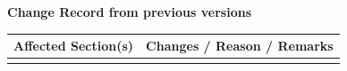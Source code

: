 \documentclass[12pt,a4paper]{article}
\begin{document}
\vspace{3cm}

\noindent
{\Large \bf Change Record from previous versions}
\medskip

\noindent
\begin{tabularx}{\textwidth}{|l|X|}
  \hline
      {\bf Affected Section(s)} & {\bf Changes / Reason / Remarks}\\
      \hline
       & \\
      \hline
\end{tabularx}


\newpage
\tableofcontents \thispagestyle{fancy}


\newpage





\newpage
\listofreq \thispagestyle{fancy}

\listofquestion \thispagestyle{fancy}


\label{LastPage}
\end{document}
